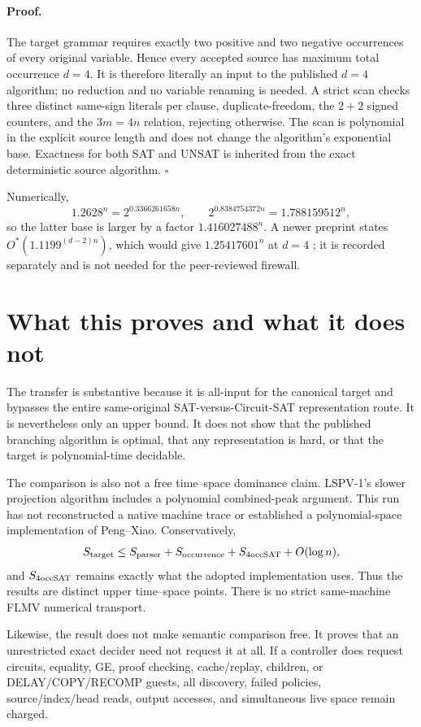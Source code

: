 \documentclass[11pt]{article}
\begin{document}
\paragraph{Proof.}
The target grammar requires exactly two positive and two negative occurrences
of every original variable.  Hence every accepted source has maximum total
occurrence $d=4$.  It is therefore literally an input to the published
$d=4$ algorithm; no reduction and no variable renaming is needed.  A strict
scan checks three distinct same-sign literals per clause, duplicate-freedom,
the $2+2$ signed counters, and the $3m=4n$ relation, rejecting otherwise.
The scan is polynomial in the explicit source length and does not change the
algorithm's exponential base.  Exactness for both SAT and UNSAT is inherited
from the exact deterministic source algorithm. \hfill$\square$

Numerically,
\[
  1.2628^n=2^{0.3366261658n},\qquad
  2^{0.8384754372n}=1.788159512^n,
\]
so the latter base is larger by a factor $1.416027488^n$.  A newer preprint
states $O^*(1.1199^{(d-2)n})$, which would give
$1.25417601^n$ at $d=4$ \cite{jainneohstephan}; it is recorded separately and
is not needed for the peer-reviewed firewall.

\section{What this proves and what it does not}
The transfer is substantive because it is all-input for the canonical target
and bypasses the entire same-original SAT-versus-Circuit-SAT representation
route.  It is nevertheless only an upper bound.  It does not show that the
published branching algorithm is optimal, that any representation is hard,
or that the target is polynomial-time decidable.

The comparison is also not a free time--space dominance claim.  LSPV-1's
slower projection algorithm includes a polynomial combined-peak argument.
This run has not reconstructed a native machine trace or established a
polynomial-space implementation of Peng--Xiao.  Conservatively,
\[
 S_{\rm target}\le S_{\rm parser}+S_{\rm occurrence}+S_{4\rm occSAT}+O(\log n),
\]
and $S_{4\rm occSAT}$ remains exactly what the adopted implementation uses.
Thus the results are distinct upper time--space points.  There is no strict
same-machine FLMV numerical transport.

Likewise, the result does not make semantic comparison free.  It proves that
an unrestricted exact decider need not request it at all.  If a controller
does request circuits, equality, GE, proof checking, cache/replay, children,
or DELAY/COPY/RECOMP guests, all discovery, failed policies, source/index/head
reads, output accesses, and simultaneous live space remain charged.
\end{document}
